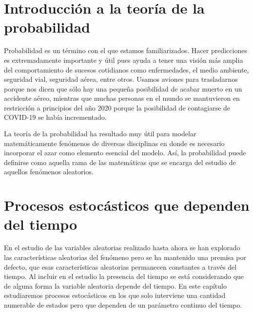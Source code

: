 \documentclass[a4paper,11pt]{book}
\begin{document}
\chapter{Introducción a la teoría de la probabilidad}
    Probabilidad es un término con el que estamos familiarizados. Hacer predicciones es extremadamente importante y útil pues ayuda a tener una visión más amplia del comportamiento de sucesos cotidianos como enfermedades, el medio ambiente, seguridad vial, seguridad aérea, entre otros.
    Usamos aviones para trasladarnos porque nos dicen que sólo hay una pequeña posibilidad de acabar muerto en un accidente aéreo, mientras que muchas personas en el mundo se mantuvieron en restricción a principios del año 2020 porque la posibilidad de contagiarse de COVID-19 se había incrementado.
    
    La teoría de la probabilidad ha resultado muy útil para modelar
    matemáticamente fenómenos de diversas disciplinas en donde es necesario incorporar el azar como elemento esencial del modelo. Así, la probabilidad puede definirse como
    aquella rama de las matemáticas que se encarga del estudio de aquellos fenómenos aleatorios.
    
    
    
    
    
    

\chapter{Procesos estocásticos que dependen del tiempo}
    En el estudio de las variables aleatorias realizado hasta ahora se han explorado las características aleatorias del fenómeno pero se ha mantenido una premisa por defecto, que esas
    características aleatorias permanecen constantes a través del tiempo. Al incluir en el estudio la presencia del tiempo se está considerando que de alguna forma la variable aleatoria depende del tiempo.
    En este capítulo estudiaremos procesos estocásticos en los que solo interviene una cantidad numerable de estados pero que dependen de un parámetro continuo del tiempo.
    
    
    
    
    
\end{document}
